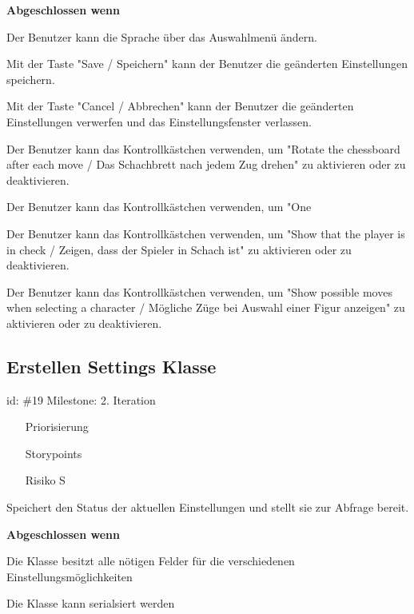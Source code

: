 \textbf{Abgeschlossen wenn}
\begin{todolist}
    \item[\done]  Der Benutzer kann die Sprache über das Auswahlmenü ändern.
  \item[\done]  Mit der Taste "Save / Speichern" kann der Benutzer die geänderten Einstellungen speichern.
  \item[\done]  Mit der Taste "Cancel / Abbrechen" kann der Benutzer die geänderten Einstellungen verwerfen und das Einstellungsfenster verlassen.
  \item[\done]  Der Benutzer kann das Kontrollkästchen verwenden, um "Rotate the chessboard after each move / Das Schachbrett nach jedem Zug drehen" zu aktivieren oder zu deaktivieren.
  \item[\done]  Der Benutzer kann das Kontrollkästchen verwenden, um "One
  \item[\done]  Der Benutzer kann das Kontrollkästchen verwenden, um "Show that the player is in check / Zeigen, dass der Spieler in Schach ist" zu aktivieren oder zu deaktivieren.
  \item[\done]  Der Benutzer kann das Kontrollkästchen verwenden, um "Show possible moves when selecting a character / Mögliche Züge bei Auswahl einer Figur anzeigen" zu aktivieren oder zu deaktivieren.

\end{todolist}


\subsection*{Erstellen Settings Klasse}
id: \#19 Milestone: 2. Iteration\\

\begin{itemize}
\item[Priorisierung] 
\item[Storypoints] 
\item[Risiko] S
\end{itemize}

Speichert den Status der aktuellen Einstellungen und stellt sie zur Abfrage bereit.

\textbf{Abgeschlossen wenn}
\begin{todolist}
    \item[\done]  Die Klasse besitzt alle nötigen Felder für die verschiedenen Einstellungsmöglichkeiten
  \item  Die Klasse kann serialsiert werden

\end{todolist}



